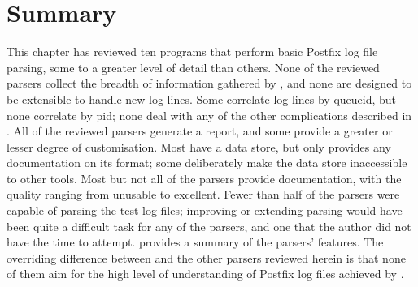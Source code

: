 \section{Summary}

This chapter has reviewed ten programs that perform basic Postfix log file
parsing, some to a greater level of detail than others.  None of the
reviewed parsers collect the breadth of information gathered by
\parsername{}, and none are designed to be extensible to handle new log
lines.  Some correlate log lines by queueid, but none correlate by pid;
none deal with any of the other complications described in
.  All of the reviewed parsers generate a
report, and some provide a greater or lesser degree of customisation.  Most
have a data store, but only  provides any documentation on its
format; some deliberately make the data store inaccessible to other tools.
Most but not all of the parsers provide documentation, with the quality
ranging from unusable to excellent.  Fewer than half of the parsers were
capable of parsing the \numberOFlogFILES{} test log files; improving or
extending parsing would have been quite a difficult task for any of the
parsers, and one that the author did not have the time to attempt.
 provides a summary of the parsers'
features.  The overriding difference between \parsername{} and the other
parsers reviewed herein is that none of them aim for the high level of
understanding of Postfix log files achieved by \parsername{}.


